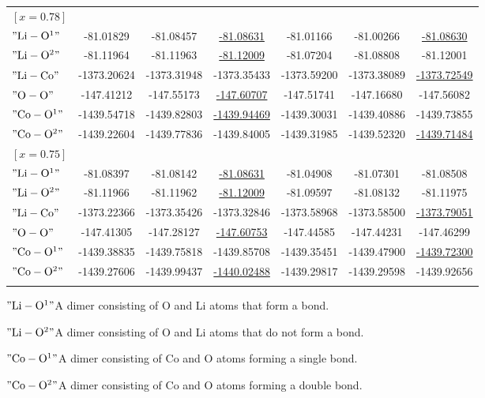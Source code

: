 \documentclass[pdflatex,sn-mathphys-num]{sn-jnl}%
\theoremstyle{thmstyleone}%
\theoremstyle{thmstyletwo}%
\theoremstyle{thmstylethree}%
\begin{document}
\begin{table}
\begin{tabular*}{\textwidth}{@{\extracolsep\fill}lcccccc}
$\left[x=0.78\right]$ &  &  &  &  &  & \\[4pt]
$\mathrm{"Li-O\footnotemark[1]"}$ & -81.01829 & -81.08457 & \underline{-81.08631} & -81.01166 & -81.00266 & \underline{-81.08630} \\
$\mathrm{"Li-O\footnotemark[2]"}$ & -81.11964 & -81.11963 & \underline{-81.12009} & -81.07204 & -81.08808 & -81.12001 \\
$\mathrm{"Li-Co"}$ & -1373.20624 & -1373.31948 & -1373.35433 & -1373.59200 & -1373.38089 & \underline{-1373.72549} \\
$\mathrm{"O-O"}$ & -147.41212 & -147.55173 & \underline{-147.60707} & -147.51741 & -147.16680 & -147.56082 \\
$\mathrm{"Co-O\footnotemark[1]"}$ & -1439.54718 & -1439.82803 & \underline{-1439.94469} & -1439.30031 & -1439.40886 & -1439.73855 \\
$\mathrm{"Co-O\footnotemark[2]"}$ & -1439.22604 & -1439.77836 & -1439.84005 & -1439.31985 & -1439.52320 & \underline{-1439.71484} \\ [8pt]

$\left[x=0.75\right]$ &  &  &  &  &  & \\[4pt]
$\mathrm{"Li-O\footnotemark[1]"}$ & -81.08397 & -81.08142 & \underline{-81.08631} & -81.04908 & -81.07301 & -81.08508 \\
$\mathrm{"Li-O\footnotemark[2]"}$ & -81.11966 & -81.11962 & \underline{-81.12009} & -81.09597 & -81.08132 & -81.11975 \\
$\mathrm{"Li-Co"}$ & -1373.22366 & -1373.35426 & -1373.32846 & -1373.58968 & -1373.58500 & \underline{-1373.79051} \\
$\mathrm{"O-O"}$ & -147.41305 & -147.28127 & \underline{-147.60753} & -147.44585 & -147.44231 & -147.46299 \\
$\mathrm{"Co-O\footnotemark[1]"}$ & -1439.38835 & -1439.75818 & -1439.85708 & -1439.35451 & -1439.47900 & \underline{-1439.72300} \\
$\mathrm{"Co-O\footnotemark[2]"}$ & -1439.27606 & -1439.99437 & \underline{-1440.02488} & -1439.29817 & -1439.29598 & -1439.92656 \\
\botrule
\end{tabular*}
$\mathrm{"Li-O\footnotemark[1]"}${A dimer consisting of O and Li atoms that form a bond.}

$\mathrm{"Li-O\footnotemark[2]"}${A dimer consisting of O and Li atoms that do not form a bond.}

$\mathrm{"Co-O\footnotemark[1]"}${A dimer consisting of Co and O atoms forming a single bond.}

$\mathrm{"Co-O\footnotemark[2]"}${A dimer consisting of Co and O atoms forming a double bond.}
\end{table}
\end{document}
